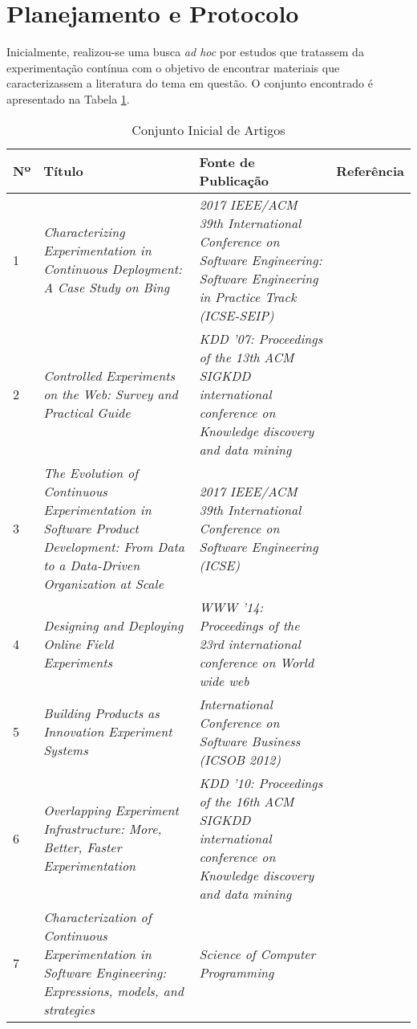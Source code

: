 \section{Planejamento e Protocolo}
\label{sec:rsl-protocolo}

Inicialmente, realizou-se uma busca \textit{ad hoc} por estudos que tratassem da experimentação contínua com o objetivo de encontrar materiais que caracterizassem a literatura do tema em questão. O conjunto encontrado é apresentado na Tabela \ref{tab:conjunto-inicial}.

\begin{table}[]
\centering
\caption{Conjunto Inicial de Artigos}
    \begin{tabular}{|p{.5cm}|p{6cm}|p{6cm}|p{1.75cm}|}
        \hline
        Nº & Título & Fonte de Publicação & Referência \\ \hline
        1 & \textit{Characterizing Experimentation in Continuous Deployment: A Case Study on Bing} & \textit{2017 IEEE/ACM 39th International Conference on Software Engineering: Software Engineering in Practice Track (ICSE-SEIP)} & \cite{kevic_characterizing_2017} \\ \hline
        2 & \textit{Controlled Experiments on the Web: Survey and Practical Guide} & \textit{KDD '07: Proceedings of the 13th ACM SIGKDD international conference on Knowledge discovery and data mining} & \cite{kohavi_controlled_2009} \\  \hline
        3 & \textit{The Evolution of Continuous Experimentation in Software Product Development: From Data to a Data-Driven Organization at Scale} & \textit{2017 IEEE/ACM 39th International Conference on Software Engineering (ICSE)} & \cite{fabijan_evolution_2017} \\ \hline
        4 & \textit{Designing and Deploying Online Field Experiments} & \textit{WWW '14: Proceedings of the 23rd international conference on World wide web} & \cite{bakshy_designing_2014} \\ \hline
        5 & \textit{Building Products as Innovation Experiment Systems} & \textit{International Conference on Software Business (ICSOB 2012)} & \cite{van_der_aalst_building_2012} \\ \hline
        6 & \textit{Overlapping Experiment Infrastructure: More, Better, Faster Experimentation} & \textit{KDD '10: Proceedings of the 16th ACM SIGKDD international conference on Knowledge discovery and data mining} & \cite{tang_overlapping_2010} \\ \hline
        7 & \textit{Characterization of Continuous Experimentation in Software Engineering: Expressions, models, and strategies} & \textit{Science of Computer Programming} & \cite{erthal_characterization_2023} \\ \hline
    \end{tabular}

    \begin{center}
        
    \end{center}

\label{tab:conjunto-inicial}
\end{table}   

